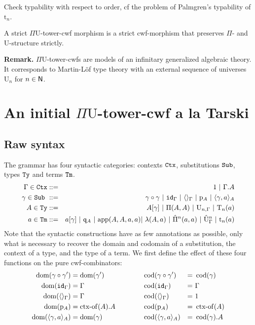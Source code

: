 \documentclass{lmcs}
\def\UU{\mathrm{U}}
\def\Ta{\mathrm{T}}
\def\Pihat{\hat{\Pi}}
\def\UUhat{\hat{\UU}}
\def\t{\mathrm{t}}
\begin{document}
Check typability with respect to order, cf the problem of Palmgren's typability of $\t_n$.

A strict $\Pi\UU$-tower-cwf morphism is a strict cwf-morphism that preserves $\Pi$- and $\UU$-structure strictly.

{\bf Remark.} $\Pi\UU$-tower-cwfs are models of an infinitary generalized algebraic theory. It corresponds to Martin-Löf type theory with an external sequence of universes $\UU_n$ for $n \in \mathsf{N}$.

\section{An initial $\Pi\UU$-tower-cwf a la Tarski}
\label{sec:syntax}

\subsection{Raw syntax}\label{sec:grammar}

The grammar has four syntactic categories: contexts ${\tt Ctx}$,
substitutions ${\tt Sub}$, types ${\tt Ty}$ and terms ${\tt Tm}$.
\begin{eqnarray*}
\Gamma \in \RawCtx &::=& 1  \ |\ \Gamma.A\\
\gamma \in \RawSub \ &::=& \gamma \circ \gamma \ |\ \id_\Gamma \ |\ \langle\rangle_\Gamma \ |\ \p_{A} \ |\ \langle \gamma, a \rangle_A\\
A \in \RawTy &::=& A[\gamma]   \ |\  \Pi(A,A)\ |\  \UU_{n,\Gamma}  \ |\  \Ta_n(a)\\
a \in \RawTm &::=& a[\gamma] \ |\ \qI_A\ |\  \ap(A,A,a,a) |\ \lambda(A,a)\ |\ \Pihat^n(a,a)\ |\ \UUhat^n_\Gamma \ |\ \t_n(a)
\end{eqnarray*}
Note that the syntactic constructions have as few annotations as possible, only what is
necessary to recover the domain and codomain of a substitution, the context of a type, and the type of a term. We first define the effect of these four functions on the pure cwf-combinators:
\begin{align*}
\operatorname{dom}(\gamma \circ \gamma') &= \operatorname{dom}(\gamma') \quad&\quad\quad & \operatorname{cod}(\gamma \circ \gamma') &=&\  \operatorname{cod}(\gamma)\\
\operatorname{dom}({\tt id}_\Gamma) &= \Gamma\quad& &\operatorname{cod}({\tt id}_\Gamma) &=&\  \Gamma\\
\operatorname{dom}(\langle\rangle_\Gamma) &= \Gamma\quad&&\operatorname{cod}(\langle\rangle_\Gamma) &=&\  1\\
\operatorname{dom}(\mathrm{p}_{A}) &= \operatorname{ctx-of}(A).A\quad&&\operatorname{cod}(\mathrm{p}_{A}) &=&\  \operatorname{ctx-of}(A) \\
\operatorname{dom}(\langle \gamma, a \rangle_A) &= \operatorname{dom}(\gamma)\quad&&\operatorname{cod}(\langle \gamma, a \rangle_A) &=&\  \operatorname{cod}(\gamma).A
\end{align*}
\end{document}
